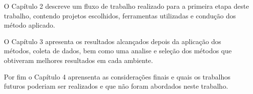 O Capítulo 2 descreve um fluxo de trabalho realizado para a primeira etapa
 deste trabalho, contendo projetos escolhidos, ferramentas utilizadas e
 condução dos método aplicado.

O Capítulo 3 apresenta os resultados alcançados depois da aplicação dos métodos, coleta de dados,
 bem como uma analise e seleção dos métodos que obtiveram melhores resultados em cada ambiente.
 
Por fim o Capítulo 4 aprensenta as considerações finais e quais os trabalhos futuros
 poderiam ser realizados e que não foram abordados neste trabalho.
